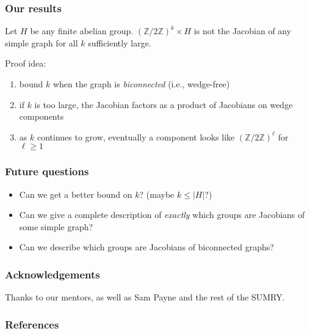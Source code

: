 \documentclass[mathserif, serif, xcolor=dvipsnames]{beamer}
\newcommand{\Z}{\ensuremath{\mathbb{Z}}}
\begin{document}
\begin{frame}
  \frametitle{Our results}
  \begin{theorem}
    Let $H$ be any finite abelian group.  $(\Z/2\Z)^k \times H$ is not
    the Jacobian of any simple graph for all $k$ sufficiently large.
  \end{theorem}
  \vspace{0.6cm}

  \pause 

  Proof idea: 
  \begin{enumerate}
  \item bound $k$ when the graph is \emph{biconnected}
    (i.e., wedge-free)
    \pause
  \item if $k$ is too large, the Jacobian factors as a product of
    Jacobians on wedge components
    \pause
  \item as $k$ continues to grow, eventually a component looks like
    $(\Z/2\Z)^\ell$ for $\ell \ge 1$
  \end{enumerate}

\end{frame}

\begin{frame}
  \frametitle{Future questions}
  \begin{itemize}
    \item Can we get a better bound on $k$? (maybe $k\le|H|$?)
      \pause
    \item Can we give a complete description of \emph{exactly} which
      groups are Jacobians of some simple graph?
      \pause
    \item Can we describe which groups are Jacobians of biconnected
      graphs?
  \end{itemize}
\end{frame}

\begin{frame}
  \frametitle{Acknowledgements}

  Thanks to our mentors, as well as Sam Payne and the rest of the
  SUMRY.
  
\end{frame}

\begin{frame}
  \frametitle{References}
\end{frame}
\end{document}
